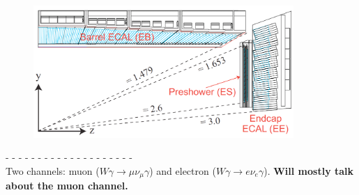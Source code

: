\begin{frame}
\begin{minipage}[c]{0.49\textwidth}
\begin{figure}[htb]
\begin{center}
      \includegraphics[width=0.88\textwidth]{../figs/ForPresentation/CMS_ECAL_eta.png}\\
    \end{center}
  \end{figure}
\end{minipage} 

\tiny
- - - - - - - - - - - - - - - - - - - - \\
Two channels: muon ($W\gamma\rightarrow \mu\nu_{\mu}\gamma$) and electron ($W\gamma\rightarrow e\nu_{e}\gamma$). {\bfseries{Will mostly talk about the muon channel.}}
\end{frame}%


